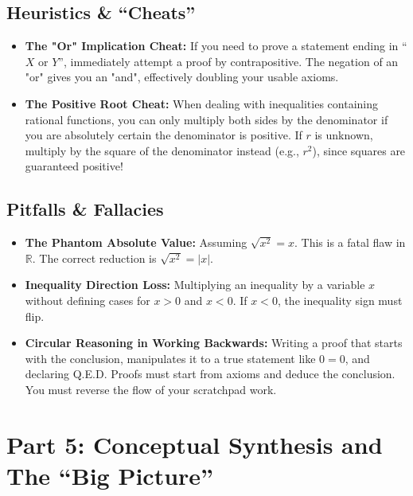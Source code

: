 \documentclass[11pt]{article}
\theoremstyle{definition}
\theoremstyle{remark}
\begin{document}
\begin{itemize}
\subsection{Heuristics \& ``Cheats''}
\begin{itemize}
    \item \textbf{The "Or" Implication Cheat:} If you need to prove a statement ending in ``$X$ or $Y$'', immediately attempt a proof by contrapositive. The negation of an "or" gives you an "and", effectively doubling your usable axioms.
    \item \textbf{The Positive Root Cheat:} When dealing with inequalities containing rational functions, you can only multiply both sides by the denominator if you are absolutely certain the denominator is positive. If $r$ is unknown, multiply by the square of the denominator instead (e.g., $r^2$), since squares are guaranteed positive!
\end{itemize}

\subsection{Pitfalls \& Fallacies}
\begin{itemize}
    \item \textbf{The Phantom Absolute Value:} Assuming $\sqrt{x^2} = x$. This is a fatal flaw in $\mathbb{R}$. The correct reduction is $\sqrt{x^2} = |x|$.
    \item \textbf{Inequality Direction Loss:} Multiplying an inequality by a variable $x$ without defining cases for $x > 0$ and $x < 0$. If $x < 0$, the inequality sign must flip.
    \item \textbf{Circular Reasoning in Working Backwards:} Writing a proof that starts with the conclusion, manipulates it to a true statement like $0 = 0$, and declaring Q.E.D. Proofs must start from axioms and deduce the conclusion. You must reverse the flow of your scratchpad work.
\end{itemize}

\newpage
\section{Part 5: Conceptual Synthesis and The ``Big Picture''}


\end{itemize}
\end{document}
